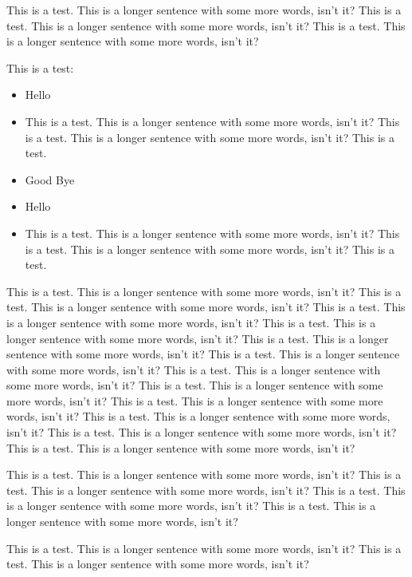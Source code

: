 \documentclass{article}
\begin{document}
This is a test. This is a longer sentence with some more words, isn't it? This is a test. This is a longer sentence with some more words, isn't it? This is a test. This is a longer sentence with some more words, isn't it?

This is a test:
\begin{itemize}
\item Hello

\item This is a test. This is a longer sentence with some more words, isn't it? This is a test. This is a longer sentence with some more words, isn't it? This is a test.

\item Good Bye

\item Hello

\item This is a test. This is a longer sentence with some more words, isn't it? This is a test. This is a longer sentence with some more words, isn't it? This is a test.
\end{itemize}

This is a test. This is a longer sentence with some more words, isn't it? This is a test. This is a longer sentence with some more words, isn't it? This is a test. This is a longer sentence with some more words, isn't it? This is a test. This is a longer sentence with some more words, isn't it? This is a test. This is a longer sentence with some more words, isn't it? This is a test. This is a longer sentence with some more words, isn't it? This is a test. This is a longer sentence with some more words, isn't it? This is a test. This is a longer sentence with some more words, isn't it? This is a test. This is a longer sentence with some more words, isn't it? This is a test. This is a longer sentence with some more words, isn't it? This is a test. This is a longer sentence with some more words, isn't it? This is a test. This is a longer sentence with some more words, isn't it?

This is a test. This is a longer sentence with some more words, isn't it? This is a test. This is a longer sentence with some more words, isn't it? This is a test. This is a longer sentence with some more words, isn't it? This is a test. This is a longer sentence with some more words, isn't it?

This is a test. This is a longer sentence with some more words, isn't it? This is a test. This is a longer sentence with some more words, isn't it? 
\end{document}
